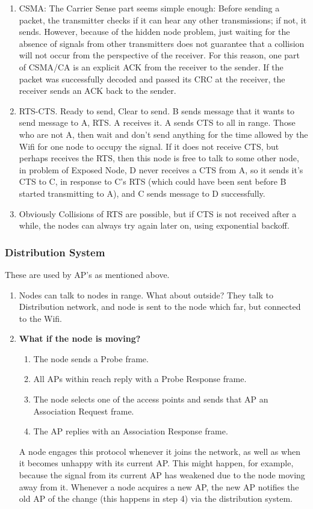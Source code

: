 \documentclass[11pt, a4paper]{article}
\begin{document}
\begin{enumerate}
    \item CSMA: The Carrier Sense part seems simple enough: Before sending a packet, the transmitter checks if it can hear any other transmissions; if not, it sends. However, because of the hidden node problem, just waiting for the absence of signals from other transmitters does not guarantee that a collision will not occur from the perspective of the receiver. For this reason, one part of CSMA/CA is an explicit ACK from the receiver to the sender. If the packet was successfully decoded and passed its CRC at the receiver, the receiver sends an ACK back to the sender.
    \item RTS-CTS. Ready to send, Clear to send. B sends message that it wants to send message to A, RTS. A receives it. A sends CTS to all in range. Those who are not A, then wait and don't send anything for the time allowed by the Wifi for one node to occupy the signal. If it does not receive CTS, but perhaps receives the RTS, then this node is free to talk to some other node, in problem of Exposed Node, D never receives a CTS from A, so it sends it's CTS to C, in response to C's RTS (which could have been sent before B started transmitting to A), and C sends message to D successfully.
    \item Obviously Collisions of RTS are possible, but if CTS is not received after a while, the nodes can always try again later on, using exponential backoff.
\end{enumerate}

\subsubsection{Distribution System}
These are used by AP's as mentioned above.
\begin{enumerate}
    \item Nodes can talk to nodes in range. What about outside? They talk to Distribution network, and node is sent to the node which far, but connected to the Wifi.
    \item \textbf{What if the node is moving?}
    \begin{enumerate}
        \item The node sends a Probe frame.
        \item All APs within reach reply with a Probe Response frame.
        \item The node selects one of the access points and sends that AP an Association Request frame.
        \item The AP replies with an Association Response frame.
    \end{enumerate}
    A node engages this protocol whenever it joins the network, as well as when it becomes unhappy with its current AP. This might happen, for example, because the signal from its current AP has weakened due to the node moving away from it. Whenever a node acquires a new AP, the new AP notifies the old AP of the change (this happens in step 4) via the distribution system.
\end{enumerate}
\end{document}
